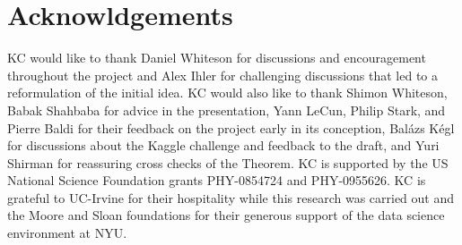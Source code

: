 \documentclass[aoas,preprint]{imsart}
\numberwithin{equation}{section}
\theoremstyle{plain}
\begin{document}
\section*{Acknowldgements}
KC would like to thank  
Daniel Whiteson for discussions and encouragement throughout the project and
Alex Ihler for challenging discussions that 
led to a reformulation of the initial idea. KC would also like to thank Shimon Whiteson, Babak Shahbaba for advice in the presentation, Yann LeCun, Philip Stark, and Pierre Baldi for their feedback on the
project early in its conception, Bal\'azs K\'egl for discussions about the Kaggle challenge and feedback to the draft, 
and Yuri Shirman for reassuring cross checks of the Theorem.
KC is supported by the US National Science Foundation grants PHY-0854724 and PHY-0955626. 
KC is grateful to UC-Irvine for their hospitality while this research was carried out and the 
Moore and Sloan foundations for their generous support of the data science environment at NYU.

%


\end{document}
